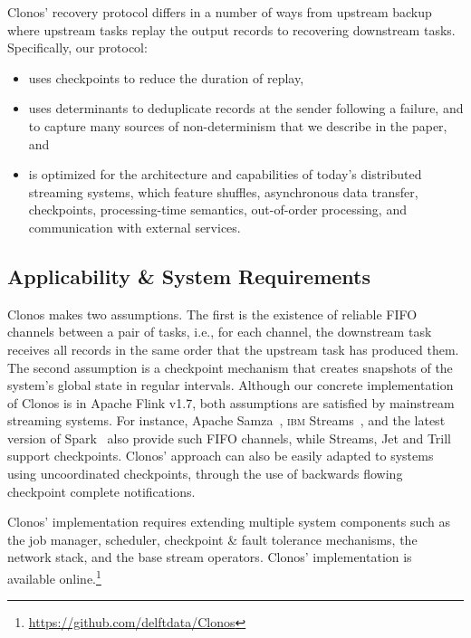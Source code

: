 \documentclass[sigconf]{acmart}
\begin{document}
\noindent Clonos' recovery protocol differs in a number of ways
from upstream backup~\cite{Hwang2005HAA} where upstream tasks replay the output records to recovering downstream tasks.
Specifically, our protocol:
\vspace{-2mm}
\begin{itemize}
\item uses checkpoints to reduce the duration of replay, 
\item uses determinants to deduplicate records at the sender following a failure, and to capture many sources of non-determinism that we describe in the paper, and
\item is optimized for the architecture and capabilities of
today's distributed streaming systems, which feature shuffles, asynchronous data transfer,
checkpoints, processing-time semantics, out-of-order processing, and communication with external services.
\end{itemize}

\subsection{Applicability \& System Requirements}
Clonos makes two assumptions. The first is the existence of reliable FIFO channels between a pair of tasks, i.e., for each channel, the downstream task receives all records in the same order that the upstream task has produced them. 
The second assumption is a checkpoint mechanism that creates snapshots of the system's global state in regular intervals. Although our concrete implementation of Clonos is in Apache Flink v1.7, both assumptions are satisfied by mainstream streaming systems. For instance, Apache Samza~\cite{NoghabiPP17}, \textsc{ibm} Streams~\cite{SilvaZD16}, and the latest version of Spark~\cite{ArmbrustDT18} also provide such FIFO channels, while Streams, Jet and Trill support checkpoints.
Clonos' approach can also be easily adapted to systems using uncoordinated checkpoints, through the use of backwards flowing checkpoint complete notifications.


Clonos' implementation requires extending multiple system components such as the job manager, scheduler, checkpoint \& fault tolerance mechanisms, the network stack, and the base stream operators.
Clonos' implementation is available online.\footnote{\url{https://github.com/delftdata/Clonos}}
\end{document}
